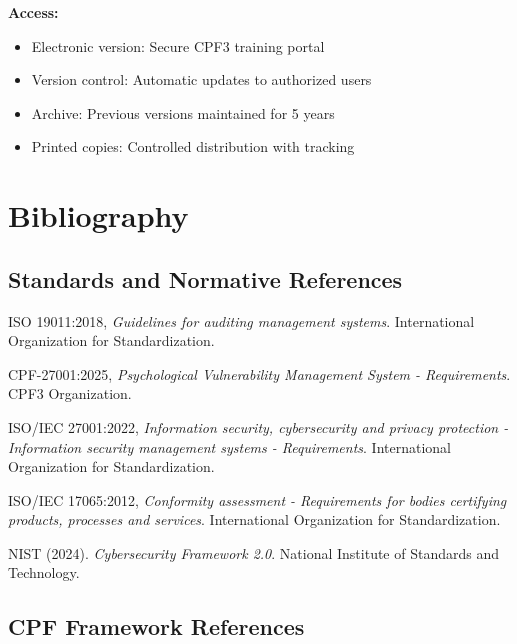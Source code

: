 \documentclass[11pt,a4paper]{article}
\begin{document}
\textbf{Access:}
\begin{itemize}
\item Electronic version: Secure CPF3 training portal
\item Version control: Automatic updates to authorized users
\item Archive: Previous versions maintained for 5 years
\item Printed copies: Controlled distribution with tracking
\end{itemize}

\section{Bibliography}

\subsection{Standards and Normative References}

\begin{thebibliography}{99}

ISO 19011:2018, \textit{Guidelines for auditing management systems}. International Organization for Standardization.

CPF-27001:2025, \textit{Psychological Vulnerability Management System - Requirements}. CPF3 Organization.

ISO/IEC 27001:2022, \textit{Information security, cybersecurity and privacy protection - Information security management systems - Requirements}. International Organization for Standardization.

ISO/IEC 17065:2012, \textit{Conformity assessment - Requirements for bodies certifying products, processes and services}. International Organization for Standardization.

NIST (2024). \textit{Cybersecurity Framework 2.0}. National Institute of Standards and Technology.

\end{thebibliography}

\subsection{CPF Framework References}
\end{document}
